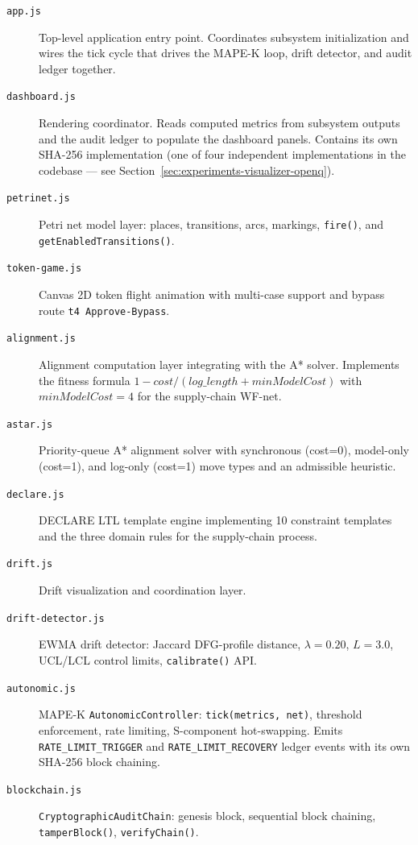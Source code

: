 \begin{description}
  \item[\texttt{app.js}] Top-level application entry point. Coordinates subsystem initialization
        and wires the tick cycle that drives the MAPE-K loop, drift detector, and audit ledger
        together.
  \item[\texttt{dashboard.js}] Rendering coordinator. Reads computed metrics from subsystem
        outputs and the audit ledger to populate the dashboard panels. Contains its own SHA-256
        implementation (one of four independent implementations in the codebase — see
        Section~\ref{sec:experiments-visualizer-openq}).
  \item[\texttt{petrinet.js}] Petri net model layer: places, transitions, arcs, markings,
        \texttt{fire()}, and \texttt{getEnabledTransitions()}.
  \item[\texttt{token-game.js}] Canvas 2D token flight animation with multi-case support and
        bypass route \texttt{t4 Approve-Bypass}.
  \item[\texttt{alignment.js}] Alignment computation layer integrating with the A* solver.
        Implements the fitness formula $1 - \mathit{cost} / (\mathit{log\_length} + \mathit{minModelCost})$
        with $\mathit{minModelCost}=4$ for the supply-chain WF-net.
  \item[\texttt{astar.js}] Priority-queue A* alignment solver with synchronous (cost=0),
        model-only (cost=1), and log-only (cost=1) move types and an admissible heuristic.
  \item[\texttt{declare.js}] DECLARE LTL template engine implementing 10 constraint templates
        and the three domain rules for the supply-chain process.
  \item[\texttt{drift.js}] Drift visualization and coordination layer.
  \item[\texttt{drift-detector.js}] EWMA drift detector: Jaccard DFG-profile distance,
        $\lambda=0.20$, $L=3.0$, UCL/LCL control limits, \texttt{calibrate()} API.
  \item[\texttt{autonomic.js}] MAPE-K \texttt{AutonomicController}: \texttt{tick(metrics, net)},
        threshold enforcement, rate limiting, S-component hot-swapping. Emits
        \texttt{RATE\_LIMIT\_TRIGGER} and \texttt{RATE\_LIMIT\_RECOVERY} ledger events with its
        own SHA-256 block chaining.
  \item[\texttt{blockchain.js}] \texttt{CryptographicAuditChain}: genesis block, sequential
        block chaining, \texttt{tamperBlock()}, \texttt{verifyChain()}.

\end{description}
